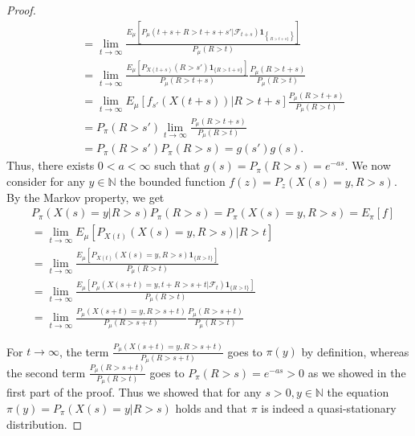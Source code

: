 \documentclass[12pt,a4paper]{scrartcl}
\numberwithin{equation}{section}
\newcommand{\N}{\mathbb{N}} %
\begin{document}
\begin{proof}
\begin{align*}
&= \lim_{t \to \infty} \frac{E_{\mu}\left[P_{\mu}\left(t+s+R > t+s+s' | \mathcal{F}_{t+s} \right) \textbf{1}_{\brace R > t +s \rbrace} \right]}{P_{\mu}\left(R > t \right)} \\
&= \lim_{t \to \infty} \frac{E_{\mu}\left[P_{X\left(t+s\right)}\left( R > s'\right) \textbf{1}_{\lbrace R > t+s \rbrace} \right]}{P_{\mu}\left(R > t+s \right)} \frac{P_{\mu}\left(R > t+s\right)}{P_{\mu}\left(R > t\right)} \\
&= \lim_{t \to \infty} E_{\mu}\left[f_{s'}\left(X\left(t+s\right) \right) | R > t+s \right] \frac{P_{\mu}\left(R > t+s\right)}{P_{\mu}\left(R > t\right)} \\
&= P_{\pi}\left( R > s' \right) \lim_{t \to \infty} \frac{P_{\mu}\left(R > t+s\right)}{P_{\mu}\left(R > t\right)} \\
&= P_{\pi}\left( R > s'\right) P_{\pi}\left(R > s\right) = g\left(s'\right) g\left(s\right).
\end{align*}
Thus, there exists $0 < a < \infty$ such that $g\left(s\right) = P_{\pi}\left( R > s\right) = e^{-as}.$ We now consider for any $y \in \N$ the bounded function $f\left(z\right) = P_z\left(X\left(s\right) = y, R > s \right). $ By the Markov property, we get
\begin{align*}
&P_{\pi}\left(X\left(s\right) = y | R > s \right) P_{\pi}\left(R > s\right) = P_{\pi}\left(X\left(s\right) = y, R > s \right) = E_{\pi}\left[f\right] \\
&= \lim_{t \to \infty} E_{\mu}\left[ P_{X\left(t\right)}\left(X\left(s\right) = y, R > s \right) | R > t \right] \\
&= \lim_{t \to \infty} \frac{E_{\mu}\left[P_{X\left(t\right)} \left(X\left(s\right) = y, R > s \right) \textbf{1}_{\lbrace R > t\rbrace}\right]}{P_{\mu}\left(R > t\right) } \\
&= \lim_{t \to \infty} \frac{E_{\mu}\left[ P_{\mu}\left(X\left(s+t\right) = y, t + R > s + t | \mathcal{F}_t \right) \textbf{1}_{\lbrace R > t\rbrace} \right] }{P_{\mu}\left(R > t \right)} \\
&= \lim_{t \to \infty} \frac{P_{\mu}\left(X\left(s+t\right) = y, R > s+t \right)}{P_{\mu}\left(R > s+t\right) } \frac{P_{\mu}\left(R > s+t\right)}{P_{\mu}\left(R > t\right)}
\end{align*}
 
For $t \to \infty$, the term $\frac{P_{\mu}\left(X\left(s+t\right) = y, R > s+t \right)}{P_{\mu}\left(R > s+t\right) }$ goes to $\pi\left(y\right)$ by definition, whereas the second term $ \frac{P_{\mu}\left(R > s+t\right)}{P_{\mu}\left(R > t\right)} $ goes to $P_{\pi}\left(R > s\right) = e^{-a s} > 0 $ as we showed in the first part of the proof. 
Thus we showed that for any $s >0, y \in \N$ the equation $ \pi\left(y\right) = P_{\pi}\left( X\left(s\right) = y | R > s\right)$ holds and that $\pi$ is indeed a quasi-stationary distribution.

\end{proof}
\end{document}
